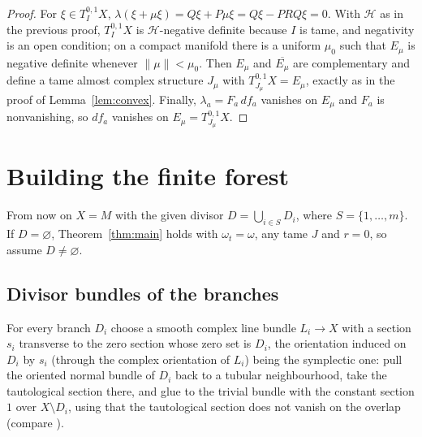 \documentclass[12pt]{article}
\theoremstyle{remark}
\begin{document}
\begin{proof}
For $\xi\in T^{0,1}_IX$, $\lambda(\xi+\mu\xi)=Q\xi+P\mu\xi=Q\xi-PRQ\xi=0$.
With $\mathcal H$ as in the previous proof, $T^{0,1}_IX$ is
$\mathcal H$-negative definite because $I$ is tame, and negativity is
an open condition; on a compact manifold there is a uniform $\mu_0$
such that $E_\mu$ is negative definite whenever $\lVert\mu\rVert<\mu_0$.
Then $E_\mu$ and $\overline{E_\mu}$ are complementary and define a
tame almost complex structure $J_\mu$ with $T^{0,1}_{J_\mu}X=E_\mu$,
exactly as in the proof of Lemma~\ref{lem:convex}. Finally,
$\lambda_a=F_a\,df_a$ vanishes on $E_\mu$ and $F_a$ is nonvanishing,
so $df_a$ vanishes on $E_\mu=T^{0,1}_{J_\mu}X$.
\end{proof}

\section{Building the finite forest}\label{sec:forest}

From now on $X=M$ with the given divisor $D=\bigcup_{i\in S}D_i$, where
$S=\{1,\dots,m\}$. If $D=\varnothing$, Theorem~\ref{thm:main} holds
with $\omega_t=\omega$, any tame $J$ and $r=0$, so assume $D\ne\varnothing$.

\subsection*{Divisor bundles of the branches}
For every branch $D_i$ choose a smooth complex line bundle $L_i\to X$
with a section $s_i$ transverse to the zero section whose zero set is
$D_i$, the orientation induced on $D_i$ by $s_i$ (through the complex
orientation of $L_i$) being the symplectic one: pull the oriented
normal bundle of $D_i$ back to a tubular neighbourhood, take the
tautological section there, and glue to the trivial bundle with the
constant section $1$ over $X\setminus D_i$, using that the tautological
section does not vanish on the overlap (compare \cite[Section 2.2]{FMZS}).
\end{document}
